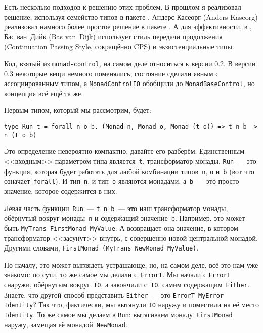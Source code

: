 Есть несколько подходов к решению этих проблем. В прошлом я реализовал решение,
используя семейство типов в пакете
.
Андерс Касеорг (Anders Kaseorg) реализовал намного более простое решение в пакете
.
А для эффективности, в
,
Бас ван~Дийк (Bas van~Dijk) использует стиль передачи продолжения (Continuation Passing Style,
сокращённо CPS) и экзистенциальные типы.

\begin{remark}
    Код, взятый из \texttt{monad-control}, на самом деле относиться к версии
    0.2. В версии 0.3 некоторые вещи немного поменялись, состояние сделали
    явным с ассоциированным типом, а \lstinline'MonadControlIO' обобщили до
    \lstinline'MonadBaseControl', но концепция всё ещё та же.
\end{remark}

Первым типом, который мы рассмотрим, будет:

\begin{lstlisting}
type Run t = forall n o b. (Monad n, Monad o, Monad (t o)) => t n b -> n (t o b)
\end{lstlisting}

Это определение невероятно компактно, давайте его разберём. Единственным
<<входным>> параметром типа является~\lstinline't', трансформатор монады.
\lstinline'Run'~--- это функция, которая будет работать для любой комбинации
типов~\lstinline'n', \lstinline'o' и~\lstinline'b' (вот что
означает~\lstinline'forall'). И тип~\lstinline'n', и тип~\lstinline'o' являются
монадами, а~\lstinline'b'~--- это просто значение, которое содержится в них.

Левая часть функции~\lstinline'Run'~--- \lstinline't n b'~--- это наш
трансформатор монады, обёрнутый вокруг монады~\lstinline'n' и содержащий
значение~\lstinline'b'. Например, это может быть
\lstinline'MyTrans FirstMonad MyValue'.
А возвращает она значение, в котором трансформатор <<засунут>> внутрь, с
совершенно новой центральной монадой. Другими словами,
\lstinline'FirstMonad (MyTrans NewMonad MyValue)'.

По началу, это может выглядеть устрашающе, но, на самом деле, всё это нам уже
знакомо: по сути, то же самое мы делали с~\lstinline'ErrorT'. Мы начали с
\lstinline'ErrorT' снаружи, обёрнутым вокруг~\lstinline'IO', а закончили
с~\lstinline'IO', самим содержащим~\lstinline'Either'. Знаете, что другой
способ представить \lstinline'Either'~--- это
\lstinline'ErrorT MyError Identity'? Так что, фактически, мы вытянули
\lstinline'IO' наружу и поместили на её место \lstinline'Identity'. То же самое
мы делаем в \lstinline'Run': вытягиваем монаду~\lstinline'FirstMonad' наружу,
замещая её монадой~\lstinline'NewMonad'.


